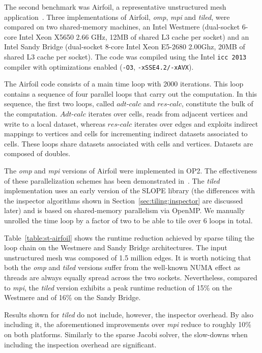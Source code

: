 The second benchmark was Airfoil, a representative unstructured mesh application~\citep{AIRFOIL}. Three implementations of Airfoil, {\em omp}, {\em mpi} and {\em tiled}, were compared on two shared-memory machines, an Intel Westmere (dual-socket 6-core Intel Xeon X5650 2.66 GHz, 12MB of shared L3 cache per socket) and an Intel Sandy Bridge (dual-socket 8-core Intel Xeon E5-2680 2.00Ghz, 20MB of shared L3 cache per socket). The code was compiled using the Intel \texttt{icc 2013} compiler with optimizations enabled (\texttt{-O3}, \texttt{-xSSE4.2/-xAVX}).

The Airfoil code consists of a main time loop with 2000 iterations. This loop contains a sequence of four parallel loops that carry out the computation. In this sequence, the first two loops, called $adt$-$calc$ and $res$-$calc$, constitute the bulk of the computation. $Adt$-$calc$ iterates over cells, reads from adjacent vertices and write to a local dataset, whereas $res$-$calc$ iterates over edges and exploits indirect mappings to vertices and cells for incrementing indirect datasets associated to cells. These loops share datasets associated with cells and vertices. Datasets are composed of doubles.

The {\em omp} and {\em mpi} versions of Airfoil were implemented in OP2. The effectiveness of these parallelization schemes has been demonstrated in~\cite{op2-main}. The {\em tiled} implementation uses an early version of the SLOPE library (the differences with the inspector algorithms shown in Section~\ref{sec:tiling:inspector} are discussed later) and is based on shared-memory parallelism via OpenMP. We manually unrolled the time loop by a factor of two to be able to tile over 6 loops in total. 


Table~\ref{table:st-airfoil} shows the runtime reduction achieved by sparse tiling the loop chain on the Westmere and Sandy Bridge architectures. The input unstructured mesh was composed of 1.5 million edges. It is worth noticing that both the {\em omp} and {\em tiled} versions suffer from the well-known NUMA effect as threads are always equally spread across the two sockets. Nevertheless, compared to {\em mpi}, the {\em tiled} version exhibits a peak runtime reduction of 15\% on the Westmere and of 16\% on the Sandy Bridge. 

Results shown for {\em tiled} do not include, however, the inspector overhead. By also including it, the aforementioned improvements over {\em mpi} reduce to roughly 10\% on both platforms. Similarly to the sparse Jacobi solver, the slow-downs when including the inspection overhead are significant.


